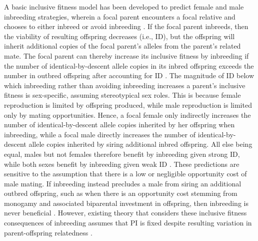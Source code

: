 \documentclass[12pt]{article}
\begin{document}
A basic inclusive fitness model has been developed to predict female and male inbreeding strategies, wherein a focal parent encounters a focal relative and chooses to either inbreed or avoid inbreeding \cite[][]{Parker1979, Parker2006, Kokko2006, Duthie2015a}. If the focal parent inbreeds, then the viability of resulting offspring decreases (i.e., ID), but the offspring will inherit additional copies of the focal parent's alleles from the parent's related mate. The focal parent can thereby increase its inclusive fitness by inbreeding if the number of identical-by-descent allele copies in its inbred offspring exceeds the number in outbred offspring after accounting for ID \cite[][]{Parker1979, Parker2006, Kokko2006, Szulkin2012, Duthie2015a}. The magnitude of ID below which inbreeding rather than avoiding inbreeding increases a parent's inclusive fitness is sex-specific, assuming stereotypical sex roles. This is because female reproduction is limited by offspring produced, while male reproduction is limited only by mating opportunities. Hence, a focal female only indirectly increases the number of identical-by-descent allele copies inherited by her offspring when inbreeding, while a focal male directly increases the number of identical-by-descent allele copies inherited by siring additional inbred offspring. All else being equal, males but not females therefore benefit by inbreeding given strong ID, while both sexes benefit by inbreeding given weak ID \cite[][]{Parker1979, Parker2006, Kokko2006, Duthie2015a}. These predictions are sensitive to the assumption that there is a low or negligible opportunity cost of male mating. If inbreeding instead precludes a male from siring an additional outbred offspring, such as when there is an opportunity cost stemming from monogamy and associated biparental investment in offspring, then inbreeding is never beneficial \cite[][]{Waser1986}. However, existing theory that considers these inclusive fitness consequences of inbreeding assumes that PI is fixed despite resulting variation in parent-offspring relatedness \cite[][]{Trivers1974, Lynch1998, Reid2016}. 
\end{document}
